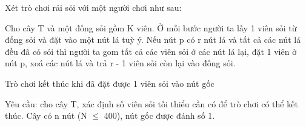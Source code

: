 Xét trò chơi rải sỏi với một người chơi như sau:

Cho cây T và một đống sỏi gồm K viên. Ở mỗi bước người ta lấy 1 viên sỏi từ đống sỏi và đặt vào một nút lá tuỳ ý. Nếu nút p có r nút lá và tất cả các nút lá đều đã có sỏi thì người ta gom tất cả các viên sỏi ở các nút lá lại, đặt 1 viên ở nút p, xoá các nút lá và trả r - 1 viên sỏi còn lại vào đống sỏi.

Trò chơi kết thúc khi đã đặt được 1 viên sỏi vào nút gốc

Yêu cầu: cho cây T, xác định số viên sỏi tối thiểu cần có để trò chơi có thể kết thúc. Cây có n nút (N  $\le$  400), nút gốc được đánh số 1.

\